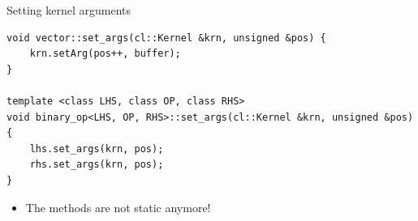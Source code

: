 \documentclass[@BEAMER_OPTIONS@]{beamer}
\begin{document}
\begin{frame}[fragile]{Setting kernel arguments}
    \begin{exampleblock}{}
        \begin{lstlisting}
void vector::set_args(cl::Kernel &krn, unsigned &pos) {
    krn.setArg(pos++, buffer);
}

template <class LHS, class OP, class RHS>
void binary_op<LHS, OP, RHS>::set_args(cl::Kernel &krn, unsigned &pos) {
    lhs.set_args(krn, pos);
    rhs.set_args(krn, pos);
}
        \end{lstlisting}
    \end{exampleblock}

    \vspace{\baselineskip}

    \begin{itemize}
        \item The methods are not static anymore!
    \end{itemize}
\end{frame}

\note{ }
\end{document}

